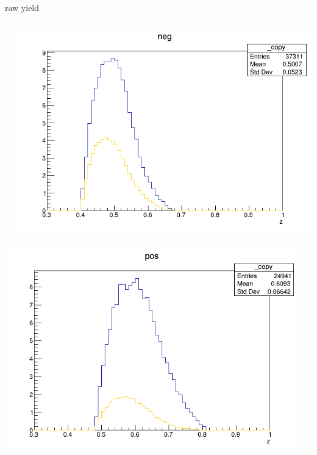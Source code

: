 \begin{frame}{raw yield}
\begin{columns}
\begin{column}[T]{0.25\textwidth}
\end{column}
\begin{column}[T]{0.25\textwidth}
\includegraphics[width = \textwidth]{results/yield/statistics/yield_x_Q2_z_0.60_4.775_0.50_neg.png}
\end{column}
\end{columns}
\begin{columns}
\begin{column}[T]{0.25\textwidth}
\includegraphics[width = \textwidth]{results/yield/statistics/yield_x_Q2_z_0.60_4.775_0.60_pos.png}
\end{column}
\begin{column}[T]{0.25\textwidth}

\end{column}
\end{columns}
\end{frame}
